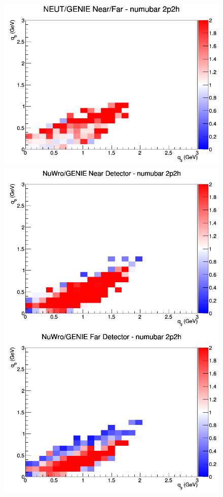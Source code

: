 \documentclass[12pt]{article}
\begin{document}
\begin{figure}[h]
\endminipage
{}
\includegraphics[width=\linewidth]{eff_q0_q3/LAr/ratios/2p2h_NEUT_GENIE_numubar_NF_q3_q0.png}
\endminipage
\newline
{}
\includegraphics[width=\linewidth]{eff_q0_q3/LAr/ratios/2p2h_NuWro_GENIE_numubar_near_q3_q0.png}
\endminipage
{}
\includegraphics[width=\linewidth]{eff_q0_q3/LAr/ratios/2p2h_NuWro_GENIE_numubar_far_q3_q0.png}

\end{figure}
\end{document}
